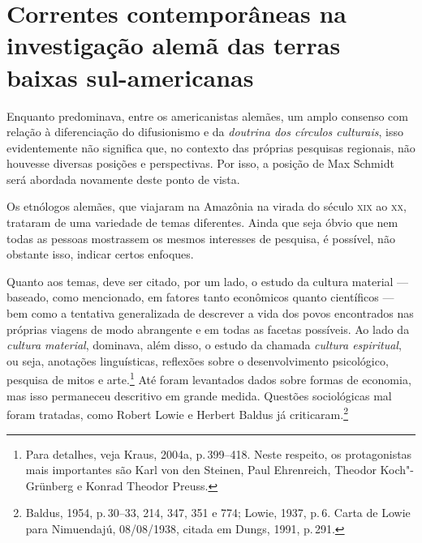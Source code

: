 \section{Correntes contemporâneas na investigação alemã das terras baixas sul-americanas}

Enquanto predominava, entre os americanistas alemães, um amplo consenso
com relação à diferenciação do difusionismo e da \textit{doutrina dos círculos
culturais}, isso evidentemente não significa que, no contexto das
próprias pesquisas regionais, não houvesse diversas posições e
perspectivas. Por isso, a posição de Max Schmidt será abordada
novamente deste ponto de vista.

Os etnólogos alemães, que viajaram na Amazônia na virada do século \textsc{xix}
ao \textsc{xx}, trataram de uma variedade de temas diferentes. Ainda que seja
óbvio que nem todas as pessoas mostrassem os mesmos interesses de
pesquisa, é possível, não obstante isso, indicar certos enfoques.

Quanto aos temas, deve ser citado, por um lado, o estudo da cultura
material --- baseado, como mencionado, em fatores tanto econômicos quanto
científicos --- bem como a tentativa generalizada de descrever a vida dos
povos encontrados nas próprias viagens de modo abrangente e em todas as
facetas possíveis. Ao lado da \textit{cultura material}, dominava, além
disso, o estudo da chamada \textit{cultura espiritual}, ou seja, anotações linguísticas, reflexões sobre o
desenvolvimento psicológico, pesquisa de mitos e arte.\footnote{Para
  detalhes, veja Kraus, 2004a, p.\,399--418. Neste respeito, os
  protagonistas mais importantes são Karl von den Steinen, Paul
  Ehrenreich, Theodor Koch"-Grünberg e Konrad Theodor Preuss.} Até foram
levantados dados sobre formas de economia, mas isso permaneceu
descritivo em grande medida. Questões sociológicas mal foram tratadas,
como Robert Lowie e Herbert Baldus já criticaram.\footnote{Baldus, 1954,
  p.\,30--33, 214, 347, 351 e 774; Lowie, 1937, p.\,6. Carta de Lowie para
  Nimuendajú, 08/08/1938, citada em Dungs, 1991, p.\,291.}


